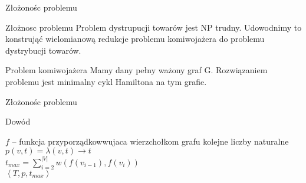 \begin{frame}{Złożonośc problemu}
	\begin{block}{Złożnosc problemu}
		Problem dystrupucji towarów jest NP trudny.
		Udowodnimy to konstrująć wielomianową redukcje problemu komiwojażera do problemu dystrybucji towarów.
	\end{block}

	\begin{block}{Problem komiwojażera}
		Mamy dany pełny ważony graf G. Rozwiązaniem problemu jest minimalny cykl Hamiltona na tym grafie.
	\end{block}
\end{frame}

\begin{frame}{Złożonośc problemu}
	\begin{block}{Dowód}
		
		\begin{algorithm}[H]
			$f$ -- funkcja przyporządkowwujaca wierzchołkom grafu kolejne liczby naturalne \\
			$p(v, t) = \lambda\left( v, t \right) \rightarrow t$ \\
			$t_{max} = \sum\limits_{i=2}^{|V|} w(f(v_{i-1}), f(v_i))$ \\
			\Return $\left< T, p , t_{max} \right> $
		\end{algorithm}
	
	\end{block}

\end{frame}
